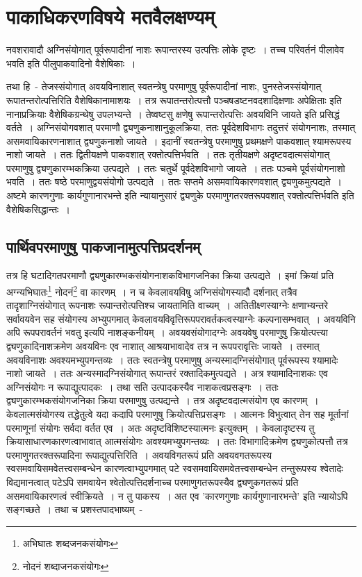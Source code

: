 	\section{पाकाधिकरणविषये मतवैलक्षण्यम्}

	नवशरावादौ अग्निसंयोगात् पूर्वरूपादीनां नाशः रूपान्तरस्य उत्पत्तिः लोके दृष्टः~। तच्च परिवर्तनं पीलावेव भवति इति पीलुपाकवादिनो वैशेषिकाः~। 

	तथा हि~- तेजस्संयोगात् अवयविनाशात् स्वतन्त्रेषु परमाणुषु पूर्वरूपादीनां नाशः, पुनस्तेजस्संयोगात् रूपातन्तरोत्पत्तिरिति वैशेषिकानामाशयः~। तत्र रूपातन्तरोत्पत्तौ पञ्चषडष्टनवदशादिक्षणाः अपेक्षिताः इति नानाप्रक्रियाः वैशेषिकग्रन्थेषु उपलभ्यन्ते~। तेष्वष्टसु क्षणेषु रूपान्तरोत्पत्तिः अवयविनि जायते इति प्रसिद्धं वर्तते~। अग्निसंयोगवशात् परमाणौ द्व्यणुकनाशानुकूलक्रिया, ततः पूर्वदेशविभागः तदुत्तरं संयोगनाशः, तस्मात् असमवायिकारणनाशात् द्व्यणुकनाशो जायते~। इदानीं स्वतन्त्रेषु परमाणुषु प्रथमक्षणे पाकवशात् श्यामरूपस्य नाशो जायते~। ततः द्वितीयक्षणे पाकवशात् रक्तोत्पत्तिर्भवति~। ततः तृतीयक्षणे अदृष्टवदात्मसंयोगात् परमाणुषु द्व्यणुकारम्भकक्रिया उत्पद्यते~। ततः‌ चतुर्थे पूर्वदेशविभागो जायते~। ततः पञ्चमे पूर्वसंयोगनाशो भवति~। ततः षष्ठे परमाणुद्वयसंयोगो उत्पद्यते~। ततः सप्तमे असमवायिकारणवशात् द्व्यणुकमुत्पद्यते~। अष्टमे कारणगुणाः कार्यगुणानारभन्ते इति न्यायानुसारं द्व्यणुके परमाणुगतरक्तरूपवशात् रक्तोत्पत्तिर्भवति इति वैशेषिकसिद्धान्तः~।

		\subsection{पार्थिवपरमाणुषु पाकजानामुत्पत्तिप्रदर्शनम्}

		तत्र हि घटादिगतपरमाणौ द्व्यणुकारम्भकसंयोगनाशकविभागजनिका क्रिया उत्पद्यते~। इमां क्रियां प्रति अग्न्यभिघातः\footnote{अभिघातः शब्दजनकसंयोगः} नोदनं\footnote{नोदनं शब्दाजनकसंयोगः} वा कारणम्~। न च केवलावयविषु अग्निसंयोगस्यादौ दर्शनात् तत्रैव तादृशाग्निसंयोगात् रूपनाशः रूपान्तरोत्पत्तिश्च जायतामिति वाच्यम्~। अतितीक्ष्णस्याग्नेः क्षणाभ्यन्तरे सर्वावयवेन सह संयोगस्य अभ्युपगमात् केवलावयविवृत्तिरूपपरावर्तकत्वस्याग्नेः कल्पनासम्भवात्~। अवयविनि अपि रूपपरावर्तनं भवतु इत्यपि नाशङ्कनीयम्~। अवयवसंयोगादग्नेः अवयवेषु परमाणुषु क्रियोत्पत्त्या द्व्यणुकादिनाशक्रमेण अवयविनः एव नाशात् आश्रयाभावादेव तत्र न रूपपरावृत्तिः जायते~। तस्मात् अवयविनाशः अवश्यमभ्युपगन्तव्यः~। ततः स्वतन्त्रेषु परमाणुषु अन्यस्मादग्निसंयोगात् पूर्वरूपस्य श्यामादेः नाशो जायते~। ततः अन्यस्मादग्निसंयोगात् रूपान्तरं रक्तादिकमुत्पद्यते~। अत्र श्यामादिनाशकः एव अग्निसंयोगः न रूपाद्युत्पादकः‌~। तथा सति उत्पादकस्यैव नाशकत्वप्रसङ्गः~। ततः द्व्यणुकारम्भकसंयोगजनिका क्रिया परमाणुषु उत्पद्यन्ते~। तत्र अदृष्टवदात्मसंयोग एव कारणम्~। केवलात्मसंयोगस्य तद्धेतुत्वे यदा कदापि परमाणुषु क्रियोत्पत्तिप्रसङ्गः~। आत्मनः विभुत्वात् तेन सह मूर्तानां परमाणूनां संयोगः सर्वदा वर्तत एव~। अतः अदृष्टविशिष्टस्यात्मनः इत्युक्तम्~। केवलादृष्टस्य तु क्रियासाधारणकारणत्वाभावात् आत्मसंयोगः अवश्यमभ्युपगन्तव्यः~। ततः विभागादिक्रमेण द्व्यणुकोत्पत्तौ तत्र परमाणुगतरक्तरूपादिना रूपाद्युत्पत्तिरिति~। अवयविगतरूपं प्रति अवयवगतरूपस्य स्वसमवायिसमवेतत्त्वसम्बन्धेन कारणत्वाभ्युपगमात् पटे स्वसमवायिसमवेतत्त्वसम्बन्धेन तन्तुरूपस्य श्वेतादेः विद्यमानत्वात् पटेऽपि समवायेन श्वेतोत्पत्तिदर्शनाच्च परमाणुगतरूपस्यैव द्व्यणुकगतरूपं प्रति असमवायिकारणत्वं स्वीक्रियते~। न तु पाकस्य~। अत एव 'कारणगुणाः कार्यगुणानारभन्ते' इति न्यायोऽपि सङ्गच्छते~। तथा च प्रशस्तपादभाष्यम्~-

